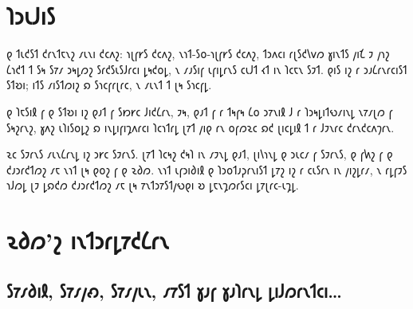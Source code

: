 \chapter*{𐑐𐑮𐑧𐑓𐑦𐑕}

𐑞 𐑑𐑧𐑒𐑕𐑑 𐑒𐑩𐑯𐑑𐑱𐑯𐑟 𐑥𐑧𐑯𐑦 𐑒𐑤𐑵𐑟: 𐑪𐑚𐑝𐑾𐑕 𐑒𐑤𐑵𐑟, 𐑯𐑪𐑑-𐑕𐑴-𐑪𐑚𐑝𐑾𐑕 𐑒𐑤𐑵𐑟, 𐑑𐑮𐑵𐑤𐑦 𐑩𐑚𐑕𐑒𐑘𐑫𐑼 𐑣𐑦𐑯𐑑𐑕 𐑢𐑦𐑗 𐑲 𐑢𐑪𐑟 𐑖𐑪𐑒𐑑 𐑑 𐑕𐑰 𐑕𐑳𐑥 𐑮𐑰𐑛𐑼𐑟 𐑕𐑩𐑒𐑕𐑧𐑕𐑓𐑩𐑤𐑦 𐑛𐑰𐑒𐑴𐑛, 𐑯 𐑥𐑨𐑕𐑦𐑝 𐑧𐑝𐑦𐑛𐑩𐑯𐑕 𐑤𐑧𐑓𐑑 𐑬𐑑 𐑦𐑯 𐑐𐑤𐑱𐑯 𐑕𐑲𐑑. 𐑞𐑦𐑕 𐑦𐑟 𐑩 𐑮𐑨𐑖𐑩𐑯𐑩𐑤𐑦𐑕𐑑 𐑕𐑑𐑹𐑦; 𐑦𐑑𐑕 𐑥𐑦𐑕𐑑𐑼𐑦𐑟 𐑸 𐑕𐑪𐑤𐑝𐑩𐑚𐑩𐑤, 𐑯 𐑥𐑧𐑯𐑑 𐑑 𐑚𐑰 𐑕𐑪𐑤𐑝𐑛.

𐑞 𐑐𐑱𐑕𐑦𐑙 𐑝 𐑞 𐑕𐑑𐑹𐑦 𐑦𐑟 𐑞𐑨𐑑 𐑝 𐑕𐑽𐑾𐑤 𐑓𐑦𐑒𐑖𐑩𐑯, 𐑲𐑰, 𐑞𐑨𐑑 𐑝 𐑩 𐑑𐑰𐑝𐑰 𐑖𐑴 𐑮𐑳𐑯𐑦𐑙 𐑓 𐑩 𐑐𐑮𐑰𐑛𐑦𐑑𐑻𐑥𐑦𐑯𐑛 𐑯𐑳𐑥𐑚𐑼 𐑝 𐑕𐑰𐑟𐑩𐑯𐑟, 𐑣𐑵𐑟 𐑧𐑐𐑦𐑕𐑴𐑛𐑟 𐑸 𐑦𐑯𐑛𐑦𐑝𐑦𐑡𐑵𐑩𐑤𐑦 𐑐𐑤𐑪𐑑𐑩𐑛 𐑚𐑳𐑑 𐑢𐑦𐑞 𐑩𐑯 𐑴𐑝𐑼𐑷𐑤 𐑸𐑒 𐑚𐑦𐑤𐑛𐑦𐑙 𐑑 𐑩 𐑓𐑲𐑯𐑩𐑤 𐑒𐑩𐑯𐑒𐑤𐑵𐑠𐑩𐑯.


𐑷𐑤 𐑕𐑲𐑩𐑯𐑕 𐑥𐑧𐑯𐑖𐑩𐑯𐑛 𐑦𐑟 𐑮𐑾𐑤 𐑕𐑲𐑩𐑯𐑕. 𐑚𐑳𐑑 𐑐𐑤𐑰𐑟 𐑒𐑰𐑐 𐑦𐑯 𐑥𐑲𐑯𐑛 𐑞𐑨𐑑, 𐑚𐑦𐑘𐑪𐑯𐑛 𐑞 𐑮𐑧𐑤𐑥 𐑝 𐑕𐑲𐑩𐑯𐑕, 𐑞 𐑝𐑿𐑟 𐑝 𐑞 𐑒𐑨𐑮𐑩𐑒𐑑𐑼𐑟 𐑥𐑱 𐑯𐑪𐑑 𐑚𐑰 𐑞𐑴𐑟 𐑝 𐑞 𐑷𐑔𐑼. 𐑯𐑪𐑑 𐑧𐑝𐑮𐑦𐑔𐑦𐑙 𐑞 𐑐𐑮𐑴𐑑𐑨𐑜𐑩𐑯𐑦𐑕𐑑 𐑛𐑳𐑟 𐑦𐑟 𐑩 𐑤𐑧𐑕𐑩𐑯 𐑦𐑯 𐑢𐑦𐑟𐑛𐑩𐑥, 𐑯 𐑩𐑛𐑝𐑲𐑕 𐑪𐑓𐑼𐑛 𐑚𐑲 𐑛𐑸𐑒𐑼 𐑒𐑨𐑮𐑩𐑒𐑑𐑼𐑟 𐑥𐑱 𐑚𐑰 𐑳𐑯𐑑𐑮𐑳𐑕𐑑𐑢𐑻𐑞𐑦 𐑹 𐑛𐑱𐑯𐑡𐑼𐑩𐑕𐑤𐑦 𐑛𐑳𐑚𐑩𐑤-𐑧𐑡𐑛.

\chapter*{𐑷𐑔𐑼'𐑟 𐑦𐑯𐑑𐑮𐑩𐑛𐑳𐑒𐑖𐑩𐑯}

\section*{𐑕𐑳𐑥𐑔𐑦𐑙, 𐑕𐑳𐑥𐑢𐑺, 𐑕𐑳𐑥𐑢𐑧𐑯, 𐑥𐑳𐑕𐑑 𐑣𐑨𐑝 𐑣𐑨𐑐𐑩𐑯𐑛 𐑛𐑦𐑓𐑼𐑩𐑯𐑑𐑤𐑦…}

